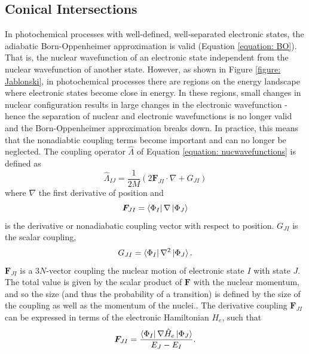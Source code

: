 \subsection{Conical Intersections} \label{section: photo_conicals}
In photochemical processes with well-defined, well-separated electronic states, the adiabatic Born-Oppenheimer approximation is valid (Equation \ref{equation: BO}). That is, the nuclear wavefunction of an electronic state independent from the nuclear wavefunction of another state. However, as shown in Figure \ref{figure: Jablonski}, in photochemical processes there are regions on the energy landscape where electronic states become close in energy. In these regions, small changes in nuclear configuration results in large changes in the electronic wavefunction - hence the separation of nuclear and electronic wavefunctions is no longer valid and the Born-Oppenheimer approximation breaks down. In practice, this means that the nonadiabtic coupling terms become important and can no longer be neglected. The coupling operator $\hat{\Lambda}$ of Equation \ref{equation: nucwavefunctions} is defined as
\begin{equation}
    \hat{\Lambda}_{IJ}=\frac{1}{2M}(2\bm{F}_{JI}\cdot{}\nabla{}+G_{JI})
\end{equation}
where $\nabla$ the first derivative of position and
\begin{equation}
    \bm{F}_{JI}=\bra{\Phi_{I}}\nabla{}\ket{\Phi_{J}}
\end{equation}
is the derivative or nonadiabatic coupling vector with respect to position. $G_{JI}$ is the scalar coupling,
\begin{equation}
    G_{JI}=\bra{\Phi_{I}}\nabla{}^{2}\ket{\Phi_{J}}.
\end{equation}
$\bm{F}_{JI}$ is a 3$N$-vector coupling the nuclear motion of electronic state $I$ with state $J$. The total value is given by the scalar product of $\bm{F}$ with the nuclear momentum, and so the size (and thus the probability of a transition) is defined by the size of the coupling as well as the momentum of the nuclei.\cite{Worth2004}. The derivative coupling $\bm{F}_{JI}$ can be expressed in terms of the electronic Hamiltonian $H_{e}$, such that
\begin{equation}\label{equation: NAC_F}
        \bm{F}_{JI}=\frac{\bra{\Phi_{I}}\nabla{}\hat{H}_{e}\ket{\Phi_{J}}}{E_{J}-E_{I}}.
\end{equation}

